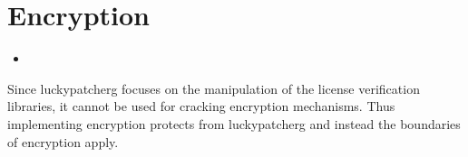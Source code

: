 \section{Encryption} \label{section:counter-replace-encryption}




\begin{itemize}
  \item
\end{itemize}
Since \gls{luckypatcherg} focuses on the manipulation of the license verification libraries, it cannot be used for cracking encryption mechanisms.
Thus implementing encryption protects from \gls{luckypatcherg} and instead the boundaries of encryption apply.
